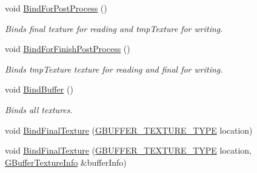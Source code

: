 \begin{DoxyCompactItemize}
void \mbox{\hyperlink{class_geometry_engine_1_1_geometry_buffer_1_1_g_buffer_ac11c8a78abc4221466afd2d73f40b97b}{Bind\+For\+Post\+Process}} ()
\begin{DoxyCompactList}\small\item\em Binds final texture for reading and tmp\+Texture for writing. \end{DoxyCompactList}\item 
\mbox{\label{class_geometry_engine_1_1_geometry_buffer_1_1_g_buffer_ae91d4ef60d2adacc2ccc8c49310610ae}} 
void \mbox{\hyperlink{class_geometry_engine_1_1_geometry_buffer_1_1_g_buffer_ae91d4ef60d2adacc2ccc8c49310610ae}{Bind\+For\+Finish\+Post\+Process}} ()
\begin{DoxyCompactList}\small\item\em Binds tmp\+Texture texture for reading and final for writing. \end{DoxyCompactList}\item 
\mbox{\label{class_geometry_engine_1_1_geometry_buffer_1_1_g_buffer_a9bcec235e3592cec2c51563b3e8984c4}} 
void \mbox{\hyperlink{class_geometry_engine_1_1_geometry_buffer_1_1_g_buffer_a9bcec235e3592cec2c51563b3e8984c4}{Bind\+Buffer}} ()
\begin{DoxyCompactList}\small\item\em Binds all textures. \end{DoxyCompactList}\item 
void \mbox{\hyperlink{class_geometry_engine_1_1_geometry_buffer_1_1_g_buffer_ad64fb7191a7dc256b1282a7f1deab756}{Bind\+Final\+Texture}} (\mbox{\hyperlink{class_geometry_engine_1_1_geometry_buffer_1_1_g_buffer_a718dceafcac1915f7de061108597e1cc}{G\+B\+U\+F\+F\+E\+R\+\_\+\+T\+E\+X\+T\+U\+R\+E\+\_\+\+T\+Y\+PE}} location)
\item 
void \mbox{\hyperlink{class_geometry_engine_1_1_geometry_buffer_1_1_g_buffer_a710627a05fa69f6aa98ee6d90ab57e85}{Bind\+Final\+Texture}} (\mbox{\hyperlink{class_geometry_engine_1_1_geometry_buffer_1_1_g_buffer_a718dceafcac1915f7de061108597e1cc}{G\+B\+U\+F\+F\+E\+R\+\_\+\+T\+E\+X\+T\+U\+R\+E\+\_\+\+T\+Y\+PE}} location, \mbox{\hyperlink{struct_geometry_engine_1_1_g_buffer_texture_info}{G\+Buffer\+Texture\+Info}} \&buffer\+Info)
\item 
\mbox{\label{class_geometry_engine_1_1_geometry_buffer_1_1_g_buffer_a1ef28cc887dbd56d20ae4df0617b8eb1}} 

\end{DoxyCompactItemize}
